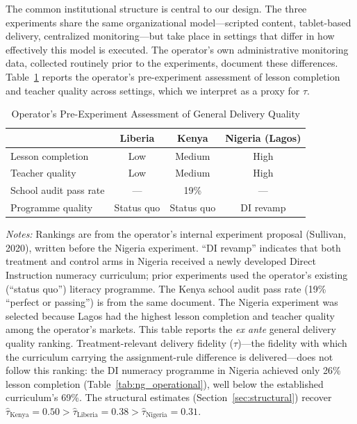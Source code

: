 \documentclass[11pt]{article}
\begin{document}
The common institutional structure is central to our design. The three experiments share the same organizational model---scripted content, tablet-based delivery, centralized monitoring---but take place in settings that differ in how effectively this model is executed. The operator's own administrative monitoring data, collected routinely prior to the experiments, document these differences. Table~\ref{tab:tau_summary} reports the operator's pre-experiment assessment of lesson completion and teacher quality across settings, which we interpret as a proxy for $\tau$.

\begin{table}[H]
\centering
\caption{Operator's Pre-Experiment Assessment of General Delivery Quality}
\label{tab:tau_summary}
\begin{threeparttable}
\begin{tabular}[t]{lccc}
\toprule
 & Liberia & Kenya & Nigeria (Lagos) \\
\midrule
Lesson completion & Low & Medium & High \\
Teacher quality & Low & Medium & High \\
School audit pass rate & --- & 19\% & --- \\
Programme quality & Status quo & Status quo & DI revamp \\
\bottomrule
\end{tabular}
\begin{tablenotes}
\footnotesize
\item \textit{Notes:} Rankings are from the operator's internal experiment proposal (Sullivan, 2020), written before the Nigeria experiment. ``DI revamp'' indicates that both treatment and control arms in Nigeria received a newly developed Direct Instruction numeracy curriculum; prior experiments used the operator's existing (``status quo'') literacy programme. The Kenya school audit pass rate (19\% ``perfect or passing'') is from the same document. The Nigeria experiment was selected because Lagos had the highest lesson completion and teacher quality among the operator's markets. This table reports the \emph{ex ante} general delivery quality ranking. Treatment-relevant delivery fidelity ($\tau$)---the fidelity with which the curriculum carrying the assignment-rule difference is delivered---does not follow this ranking: the DI numeracy programme in Nigeria achieved only 26\% lesson completion (Table~\ref{tab:ng_operational}), well below the established curriculum's 69\%. The structural estimates (Section~\ref{sec:structural}) recover $\hat{\tau}_{\text{Kenya}} = 0.50 > \hat{\tau}_{\text{Liberia}} = 0.38 > \hat{\tau}_{\text{Nigeria}} = 0.31$.
\end{tablenotes}
\end{threeparttable}
\end{table}
\end{document}
